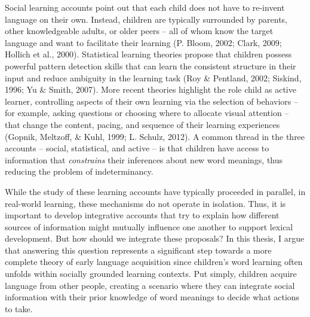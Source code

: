 \documentclass[oneside]{report}
\begin{document}
Social learning accounts point out that each child does not have to
re-invent language on their own. Instead, children are typically
surrounded by parents, other knowledgeable adults, or older peers -- all
of whom know the target language and want to facilitate their learning
(P. Bloom, 2002; Clark, 2009; Hollich et al., 2000). Statistical
learning theories propose that children possess powerful pattern
detection skills that can learn the consistent structure in their input
and reduce ambiguity in the learning task (Roy \& Pentland, 2002;
Siskind, 1996; Yu \& Smith, 2007). More recent theories highlight the
role child as active learner, controlling aspects of their own learning
via the selection of behaviors -- for example, asking questions or
choosing where to allocate visual attention -- that change the content,
pacing, and sequence of their learning experiences (Gopnik, Meltzoff, \&
Kuhl, 1999; L. Schulz, 2012). A common thread in the three accounts --
social, statistical, and active -- is that children have access to
information that \emph{constrains} their inferences about new word
meanings, thus reducing the problem of indeterminancy.

While the study of these learning accounts have typically proceeded in
parallel, in real-world learning, these mechanisms do not operate in
isolation. Thus, it is important to develop integrative accounts that
try to explain how different sources of information might mutually
influence one another to support lexical development. But how should we
integrate these proposals? In this thesis, I argue that answering this
question represents a significant step towards a more complete theory of
early language acquisition since children's word learning often unfolds
within socially grounded learning contexts. Put simply, children acquire
language from other people, creating a scenario where they can integrate
social information with their prior knowledge of word meanings to decide
what actions to take.
\end{document}
